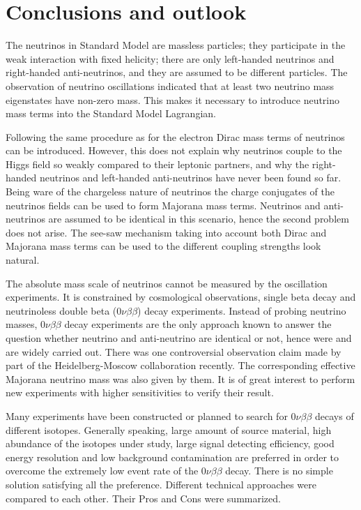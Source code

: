 \chapter{Conclusions and outlook}
\label{cha:con}
The neutrinos in Standard Model are massless particles; they participate in the weak interaction with fixed helicity; there are only left-handed neutrinos and right-handed anti-neutrinos, and they are assumed to be different particles. The observation of neutrino oscillations indicated that at least two neutrino mass eigenstates have non-zero mass. This makes it necessary to introduce neutrino mass terms into the Standard Model Lagrangian. 

Following the same procedure as for the electron Dirac mass terms of neutrinos can be introduced. However, this does not explain why neutrinos couple to the Higgs field so weakly compared to their leptonic partners, and why the right-handed neutrinos and left-handed anti-neutrinos have never been found so far. Being ware of the chargeless nature of neutrinos the charge conjugates of the neutrinos fields can be used to form Majorana mass terms. Neutrinos and anti-neutrinos are assumed to be identical in this scenario, hence the second problem does not arise. The see-saw mechanism taking into account both Dirac and Majorana mass terms can be used to the different coupling strengths look natural.

The absolute mass scale of neutrinos cannot be measured by the oscillation experiments. It is constrained by cosmological observations, single beta decay and neutrinoless double beta ($0\nu\beta\beta$) decay experiments. Instead of probing neutrino masses, $0\nu\beta\beta$ decay experiments are the only approach known to answer the question whether neutrino and anti-neutrino are identical or not, hence were and are widely carried out. There was one controversial observation claim made by part of the Heidelberg-Moscow collaboration recently. The corresponding effective Majorana neutrino mass was also given by them. It is of great interest to perform new experiments with higher sensitivities to verify their result.

Many experiments have been constructed or planned to search for $0\nu\beta\beta$ decays of different isotopes. Generally speaking, large amount of source material, high abundance of the isotopes under study, large signal detecting efficiency, good energy resolution and low background contamination are preferred in order to overcome the extremely low event rate of the $0\nu\beta\beta$ decay. There is no simple solution satisfying all the preference. Different technical approaches were compared to each other. Their Pros and Cons were summarized.

